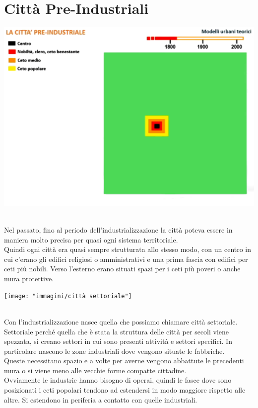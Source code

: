 \documentclass[a4paper,12pt, oneside]{book}
\begin{document}
  \section{Città Pre-Industriali}
  \begin{center}
  	\includegraphics[width=0.6\linewidth]{"immagini/modelli urbani teorici"}
  	\label{fig:modelli urbani teorici}
  \end{center}
  \leavevmode\\
  Nel passato, fino al periodo dell'industrializzazione la città poteva essere in maniera molto precisa per quasi ogni sistema territoriale.\\ 
  Quindi ogni città era quasi sempre strutturata allo stesso modo, con un centro in cui c'erano gli edifici religiosi o amministrativi e una prima fascia con edifici per ceti più nobili. Verso l'esterno erano situati spazi per i ceti più poveri o anche mura protettive.\\
  \begin{center}
  	\texttt{[image: "immagini/città settoriale"]}
  	\label{fig:città settoriale}
  \end{center}
  \leavevmode\\
  Con l'industrializzazione nasce quella che possiamo chiamare città settoriale.\\
  Settoriale perché quella che è stata la struttura delle città per secoli viene spezzata, si creano settori in cui sono presenti attività e settori specifici. In particolare nascono le zone industriali dove vengono situate le fabbriche.\\
  Queste necessitano spazio e a volte per averne vengono abbattute le precedenti mura o si viene meno alle vecchie forme compatte cittadine.\\
  Ovviamente le industrie hanno bisogno di operai, quindi le fasce dove sono posizionati i ceti popolari tendono ad estendersi in modo maggiore rispetto alle altre. Si estendono in periferia a contatto con quelle industriali.\\
\end{document}
